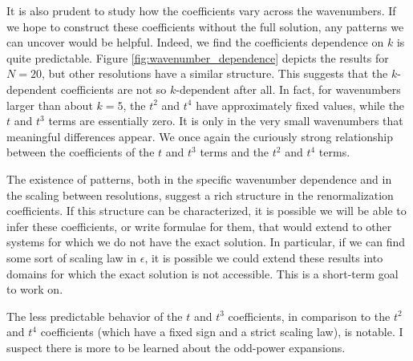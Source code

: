 \documentclass{article}
\begin{document}
It is also prudent to study how the coefficients vary across the wavenumbers. If we hope to construct these coefficients without the full solution, any patterns we can uncover would be helpful. Indeed, we find the coefficients dependence on $k$ is quite predictable. Figure \ref{fig:wavenumber_dependence} depicts the results for $N=20$, but other resolutions have a similar structure. This suggests that the $k$-dependent coefficients are not so $k$-dependent after all. In fact, for wavenumbers larger than about $k=5$, the $t^2$ and $t^4$ have approximately fixed values, while the $t$ and $t^3$ terms are essentially zero. It is only in the very small wavenumbers that meaningful differences appear. We once again the curiously strong relationship between the coefficients of the $t$ and $t^3$ terms and the $t^2$ and $t^4$ terms.

The existence of patterns, both in the specific wavenumber dependence and in the scaling between resolutions, suggest a rich structure in the renormalization coefficients. If this structure can be characterized, it is possible we will be able to infer these coefficients, or write formulae for them, that would extend to other systems for which we do not have the exact solution. In particular, if we can find some sort of scaling law in $\epsilon$, it is possible we could extend these results into domains for which the exact solution is not accessible. This is a short-term goal to work on.

The less predictable behavior of the $t$ and $t^3$ coefficients, in comparison to the $t^2$ and $t^4$ coefficients (which have a fixed sign and a strict scaling law), is notable. I suspect there is more to be learned about the odd-power expansions.
\end{document}
